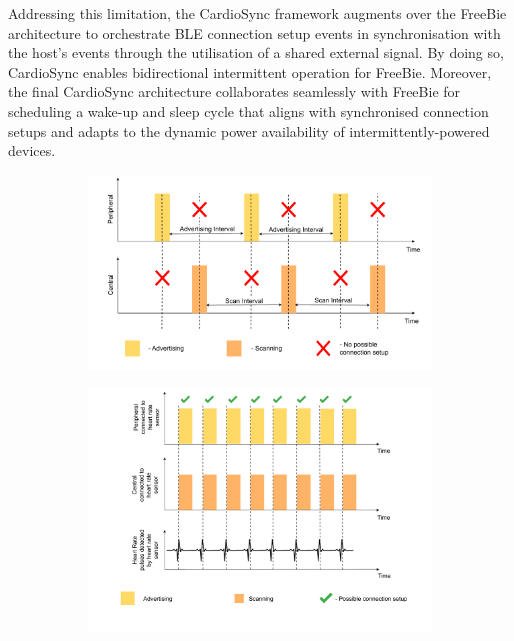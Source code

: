 \noindent Addressing this limitation, the CardioSync framework augments over the FreeBie architecture to orchestrate BLE connection setup events in synchronisation with the host's events through the utilisation of a shared external signal. By doing so, CardioSync enables bidirectional intermittent operation for FreeBie. Moreover, the final CardioSync architecture collaborates seamlessly with FreeBie for scheduling a wake-up and sleep cycle that aligns with synchronised connection setups and adapts to the dynamic power availability of intermittently-powered devices.
\vspace{3\baselineskip}
\begin{figure}[t]
    \begin{subfigure}{1\linewidth}
        \centering
        \includegraphics[width=\linewidth]{chapters/Architecture/FreeBie_concept.pdf}
        \label{fig:concept_freebie}
        \vspace{1\baselineskip}
    \end{subfigure}
    \begin{subfigure}{1\linewidth}
        \centering
        \includegraphics[width=\linewidth]{chapters/Architecture/CardioSync_concept.pdf}

\end{subfigure}
\end{figure}
